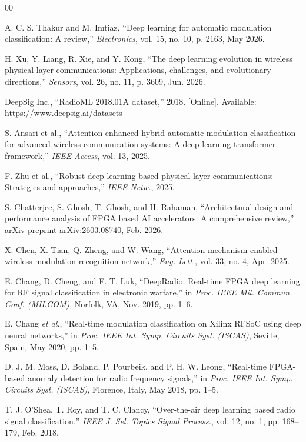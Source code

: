 \documentclass[conference]{IEEEtran}
\begin{document}
\begin{thebibliography}{00}

 A. C. S. Thakur and M. Imtiaz, ``Deep learning for automatic modulation classification: A review,'' \emph{Electronics}, vol. 15, no. 10, p. 2163, May 2026.

 H. Xu, Y. Liang, R. Xie, and Y. Kong, ``The deep learning evolution in wireless physical layer communications: Applications, challenges, and evolutionary directions,'' \emph{Sensors}, vol. 26, no. 11, p. 3609, Jun. 2026.

 DeepSig Inc., ``RadioML 2018.01A dataset,'' 2018. [Online]. Available: https://www.deepsig.ai/datasets

 S. Ansari et al., ``Attention-enhanced hybrid automatic modulation classification for advanced wireless communication systems: A deep learning-transformer framework,'' \emph{IEEE Access}, vol. 13, 2025.

 F. Zhu et al., ``Robust deep learning-based physical layer communications: Strategies and approaches,'' \emph{IEEE Netw.}, 2025.

 S. Chatterjee, S. Ghosh, T. Ghosh, and H. Rahaman, ``Architectural design and performance analysis of FPGA based AI accelerators: A comprehensive review,'' arXiv preprint arXiv:2603.08740, Feb. 2026.

 X. Chen, X. Tian, Q. Zheng, and W. Wang, ``Attention mechanism enabled wireless modulation recognition network,'' \emph{Eng. Lett.}, vol. 33, no. 4, Apr. 2025.

 E. Chang, D. Cheng, and F. T. Luk, ``DeepRadio: Real-time FPGA deep learning for RF signal classification in electronic warfare,'' in \emph{Proc. IEEE Mil. Commun. Conf. (MILCOM)}, Norfolk, VA, Nov. 2019, pp. 1--6.

 E. Chang \emph{et al.}, ``Real-time modulation classification on Xilinx RFSoC using deep neural networks,'' in \emph{Proc. IEEE Int. Symp. Circuits Syst. (ISCAS)}, Seville, Spain, May 2020, pp. 1--5.

 D. J. M. Moss, D. Boland, P. Pourbeik, and P. H. W. Leong, ``Real-time FPGA-based anomaly detection for radio frequency signals,'' in \emph{Proc. IEEE Int. Symp. Circuits Syst. (ISCAS)}, Florence, Italy, May 2018, pp. 1--5.

 T. J. O'Shea, T. Roy, and T. C. Clancy, ``Over-the-air deep learning based radio signal classification,'' \emph{IEEE J. Sel. Topics Signal Process.}, vol. 12, no. 1, pp. 168--179, Feb. 2018.


\end{thebibliography}
\end{document}
